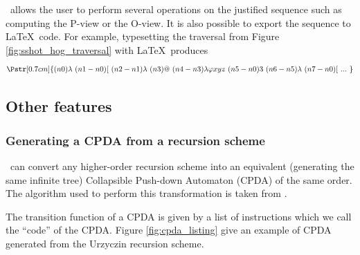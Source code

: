 \toolname\ allows the user to perform several operations on the justified sequence such as computing the P-view or the O-view. It is also possible to export the sequence to \LaTeX\ code. For example, typesetting the traversal from Figure \ref{fig:sshot_hog_traversal} with \LaTeX\ produces
$$\Pstr[0.7cm]{(n0){\lambda }\ (n1-n0){[}\ (n2-n1){\lambda }\ (n3){@}\ (n4-n3){\lambda \varphi x y z}\ (n5-n0){3}\ (n6-n5){\lambda }\ (n7-n0){[}\ {...}\ }$$

\subsection{Other features}




\subsubsection{Generating a CPDA from a recursion scheme}
\toolname\ can  convert any higher-order recursion scheme into an equivalent (\ie generating the same infinite tree) Collapsible Push-down Automaton (CPDA) of the same order. The algorithm used to perform this transformation is taken from \cite{hague-sto07}.

The transition function of a CPDA is given by a list of instructions which we call the ``code'' of the CPDA. Figure \ref{fig:cpda_listing} give an example of CPDA generated from the Urzyczin recursion scheme.

